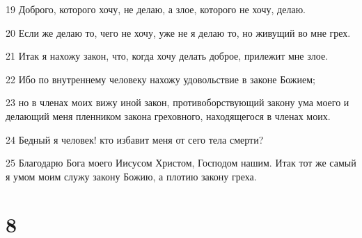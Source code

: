 \par 19 Доброго, которого хочу, не делаю, а злое, которого не хочу, делаю.
\par 20 Если же делаю то, чего не хочу, уже не я делаю то, но живущий во мне грех.
\par 21 Итак я нахожу закон, что, когда хочу делать доброе, прилежит мне злое.
\par 22 Ибо по внутреннему человеку нахожу удовольствие в законе Божием;
\par 23 но в членах моих вижу иной закон, противоборствующий закону ума моего и делающий меня пленником закона греховного, находящегося в членах моих.
\par 24 Бедный я человек! кто избавит меня от сего тела смерти?
\par 25 Благодарю Бога моего Иисусом Христом, Господом нашим. Итак тот же самый я умом моим служу закону Божию, а плотию закону греха.

\chapter{8}

